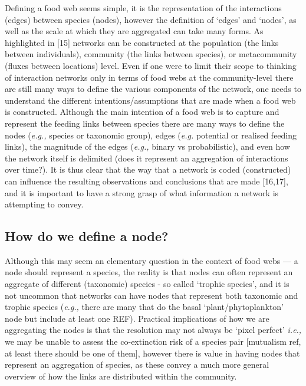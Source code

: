 \documentclass[
]{article}
\begin{document}
Defining a food web seems simple, it is the representation of the
interactions (edges) between species (nodes), however the definition of
`edges' and `nodes', as well as the scale at which they are aggregated
can take many forms. As highlighted in {[}15{]} networks can be
constructed at the population (the links between individuals), community
(the links between species), or metacommunity (fluxes between locations)
level. Even if one were to limit their scope to thinking of interaction
networks only in terms of food webs at the community-level there are
still many ways to define the various components of the network, one
needs to understand the different intentions/assumptions that are made
when a food web is constructed. Although the main intention of a food
web is to capture and represent the feeding links between species there
are many ways to define the nodes (\emph{e.g.,} species or taxonomic
group), edges (\emph{e.g.} potential or realised feeding links), the
magnitude of the edges (\emph{e.g.,} binary vs probabilistic), and even
how the network itself is delimited (does it represent an aggregation of
interactions over time?). It is thus clear that the way that a network
is coded (constructed) can influence the resulting observations and
conclusions that are made {[}16,17{]}, and it is important to have a
strong grasp of what information a network is attempting to convey.

\subsection{How do we define a node?}\label{how-do-we-define-a-node}

Although this may seem an elementary question in the context of food
webs --- a node should represent a species, the reality is that nodes
can often represent an aggregate of different (taxonomic) species - so
called `trophic species', and it is not uncommon that networks can have
nodes that represent both taxonomic and trophic species (\emph{e.g.,}
there are many that do the basal `plant/phytoplankton' node but include
at least one REF). Practical implications of how we are aggregating the
nodes is that the resolution may not always be `pixel perfect'
\emph{i.e.,} we may be unable to assess the co-extinction risk of a
species pair {[}mutualism ref, at least there should be one of them{]},
however there is value in having nodes that represent an aggregation of
species, as these convey a much more general overview of how the links
are distributed within the community.
\end{document}
